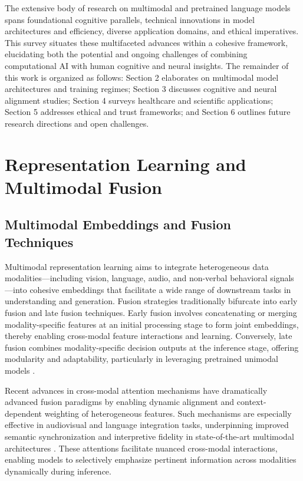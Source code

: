 The extensive body of research on multimodal and pretrained language models spans foundational cognitive parallels, technical innovations in model architectures and efficiency, diverse application domains, and ethical imperatives. This survey situates these multifaceted advances within a cohesive framework, elucidating both the potential and ongoing challenges of combining computational AI with human cognitive and neural insights. The remainder of this work is organized as follows: Section 2 elaborates on multimodal model architectures and training regimes; Section 3 discusses cognitive and neural alignment studies; Section 4 surveys healthcare and scientific applications; Section 5 addresses ethical and trust frameworks; and Section 6 outlines future research directions and open challenges.

\section{Representation Learning and Multimodal Fusion}

\subsection{Multimodal Embeddings and Fusion Techniques}

Multimodal representation learning aims to integrate heterogeneous data modalities---including vision, language, audio, and non-verbal behavioral signals---into cohesive embeddings that facilitate a wide range of downstream tasks in understanding and generation. Fusion strategies traditionally bifurcate into early fusion and late fusion techniques. Early fusion involves concatenating or merging modality-specific features at an initial processing stage to form joint embeddings, thereby enabling cross-modal feature interactions and learning. Conversely, late fusion combines modality-specific decision outputs at the inference stage, offering modularity and adaptability, particularly in leveraging pretrained unimodal models \cite{ref1,ref2}. 

Recent advances in cross-modal attention mechanisms have dramatically advanced fusion paradigms by enabling dynamic alignment and context-dependent weighting of heterogeneous features. Such mechanisms are especially effective in audiovisual and language integration tasks, underpinning improved semantic synchronization and interpretive fidelity in state-of-the-art multimodal architectures \cite{ref3,ref4,ref5,ref12,ref32}. These attentions facilitate nuanced cross-modal interactions, enabling models to selectively emphasize pertinent information across modalities dynamically during inference.

